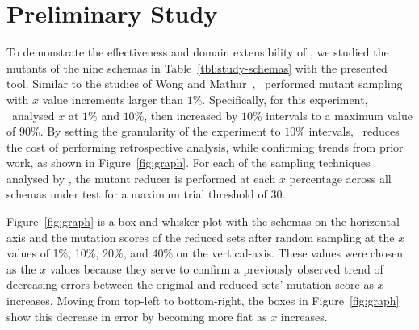 \section{Preliminary Study}


To demonstrate the effectiveness and domain extensibility of \mrstudyr, we studied the mutants of the nine schemas in
Table~\ref{tbl:study-schemas} with the presented tool. Similar to the studies of Wong and Mathur~\cite{mathur1994empirical},
\mr~performed mutant sampling with $x$ value increments larger than $1\%$. Specifically, for this experiment, \mr~analysed
$x$ at $1\%$ and $10\%$, then increased by $10\%$ intervals to a maximum value of $90\%$. By setting the granularity of the
experiment to $10\%$ intervals, \mr~reduces the cost of performing retrospective analysis, while confirming trends from prior
work, as shown in Figure~\ref{fig:graph}. For each of the sampling techniques analysed by \mr, the mutant reducer is performed
at each $x$ percentage across all schemas under test for a maximum trial threshold of 30.


Figure~\ref{fig:graph} is a box-and-whisker plot with the schemas on the horizontal-axis and the mutation scores of the reduced
sets after random sampling at the $x$ values of 1\%, 10\%, 20\%, and 40\% on the vertical-axis.  These values were chosen as the
$x$ values because they serve to confirm a previously observed trend of decreasing errors between the original and reduced sets'
mutation score as $x$ increases. Moving from top-left to bottom-right, the boxes in Figure~\ref{fig:graph} show this decrease in
error by becoming more flat as $x$ increases.



